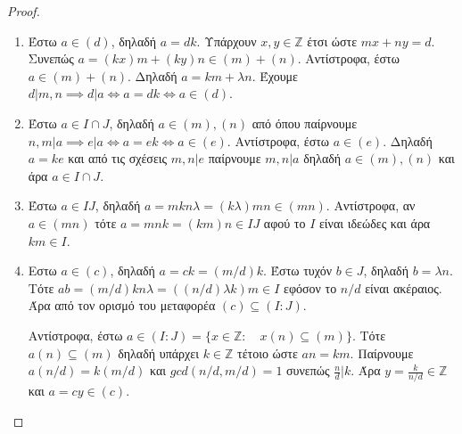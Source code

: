\documentclass[oneside,a4paper]{article}
\newcommand{\Z}{\mathbb{Z}}
\begin{document}
\begin{proof} $ $
	$ $\newline
	\begin{enumerate}
		\item Έστω $a \in (d)$, δηλαδή $a = dk$. Υπάρχουν $x,y \in \Z$ έτσι ώστε $mx+ny = d$. Συνεπώς $a = (kx)m + (ky)n \in (m)+(n)$. Αντίστροφα, έστω $a \in (m)+(n)$. Δηλαδή $a = km + \lambda n$. Έχουμε $d|m,n \implies d|a \iff a=dk \iff a \in (d)$.
		\item Έστω $a \in I\cap J$, δηλαδή $a \in (m),(n)$ από όπου παίρνουμε $n,m|a \implies e|a \iff a = ek \iff a \in (e)$. Αντίστροφα, έστω $a \in (e)$. Δηλαδή $a = ke$ και από τις σχέσεις $m,n|e$ παίρνουμε $m,n|a$ δηλαδή $a \in (m),(n)$ και άρα $a \in I\cap J$.
		\item Έστω $a \in IJ$, δηλαδή $a = mkn\lambda = (k\lambda )mn \in (mn)$. Αντίστροφα, αν $a \in (mn)$ τότε $a = mnk = (km) n \in IJ$ αφού το $I$ είναι ιδεώδες και άρα $km \in I$.
		\item Εστω $a \in (c)$, δηλαδή $a = ck = (m/d) k$. Έστω τυχόν $b \in J$, δηλαδή $b = \lambda n$. Τότε $ab = (m/d)k n \lambda = \left( \left( n/d \right) \lambda k \right) m \in I$ εφόσον το $n/d$ είναι ακέραιος. Άρα από τον ορισμό του μεταφορέα $(c) \subseteq (I:J)$.
		
		\indent Αντίστροφα, έστω $a \in (I:J) = \{ x \in \Z: \quad x(n) \subseteq (m)\}$. Τότε $a (n) \subseteq (m)$ δηλαδή υπάρχει $k \in \Z$ τέτοιο ώστε $an = km$. Παίρνουμε $a (n/d) = k (m/d)$ και $gcd(n/d,m/d) = 1$ συνεπώς $\frac nd | k$. Άρα $y = \frac k{n/d} \in \Z$ και $a = cy \in (c)$.
		\end{enumerate}
\end{proof}

\pagebreak
\end{document}
